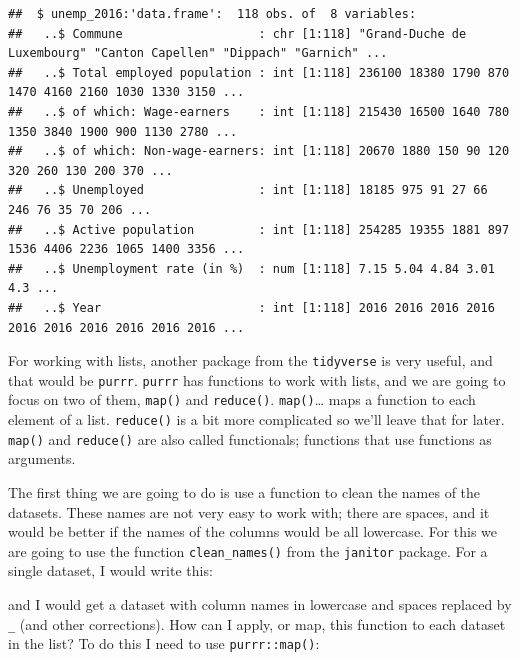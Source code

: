 \documentclass[]{gitbook}
\newenvironment{Shaded}{\begin{snugshade}}{\end{snugshade}}
\newcommand{\KeywordTok}[1]{\textcolor[rgb]{0.13,0.29,0.53}{\textbf{#1}}}
\newcommand{\NormalTok}[1]{#1}
\newcommand{\OperatorTok}[1]{\textcolor[rgb]{0.81,0.36,0.00}{\textbf{#1}}}
\newcommand{\StringTok}[1]{\textcolor[rgb]{0.31,0.60,0.02}{#1}}
\theoremstyle{definition}
\theoremstyle{definition}
\theoremstyle{definition}
\theoremstyle{remark}
\begin{document}
\begin{verbatim}
##  $ unemp_2016:'data.frame':  118 obs. of  8 variables:
##   ..$ Commune                   : chr [1:118] "Grand-Duche de Luxembourg" "Canton Capellen" "Dippach" "Garnich" ...
##   ..$ Total employed population : int [1:118] 236100 18380 1790 870 1470 4160 2160 1030 1330 3150 ...
##   ..$ of which: Wage-earners    : int [1:118] 215430 16500 1640 780 1350 3840 1900 900 1130 2780 ...
##   ..$ of which: Non-wage-earners: int [1:118] 20670 1880 150 90 120 320 260 130 200 370 ...
##   ..$ Unemployed                : int [1:118] 18185 975 91 27 66 246 76 35 70 206 ...
##   ..$ Active population         : int [1:118] 254285 19355 1881 897 1536 4406 2236 1065 1400 3356 ...
##   ..$ Unemployment rate (in %)  : num [1:118] 7.15 5.04 4.84 3.01 4.3 ...
##   ..$ Year                      : int [1:118] 2016 2016 2016 2016 2016 2016 2016 2016 2016 2016 ...
\end{verbatim}

For working with lists, another package from the \texttt{tidyverse} is
very useful, and that would be \texttt{purrr}. \texttt{purrr} has
functions to work with lists, and we are going to focus on two of them,
\texttt{map()} and \texttt{reduce()}. \texttt{map()}\ldots{} maps a
function to each element of a list. \texttt{reduce()} is a bit more
complicated so we'll leave that for later. \texttt{map()} and
\texttt{reduce()} are also called functionals; functions that use
functions as arguments.

The first thing we are going to do is use a function to clean the names
of the datasets. These names are not very easy to work with; there are
spaces, and it would be better if the names of the columns would be all
lowercase. For this we are going to use the function
\texttt{clean\_names()} from the \texttt{janitor} package. For a single
dataset, I would write this:

\begin{Shaded}
\end{Shaded}

and I would get a dataset with column names in lowercase and spaces
replaced by \texttt{\_} (and other corrections). How can I apply, or
map, this function to each dataset in the list? To do this I need to use
\texttt{purrr::map()}:
\end{document}
